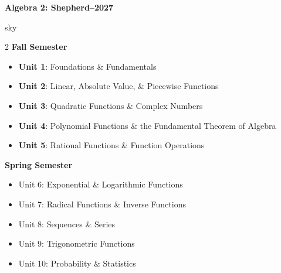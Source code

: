 \documentclass[12pt]{article}
\newcommand{\CourseName}{Algebra 2: Shepherd}
\newcommand{\SchoolYear}{2026--2027}
\begin{document}
    \begin{center}
        {\Large\bfseries \CourseName \quad \SchoolYear}
    \end{center}

    \renewcommand{\arraystretch}{1.6}
    \begin{skillbox}{sky}
        \setlength{\parskip}{0.6em}
        \setlength{\parindent}{0pt}
        \setlength{\columnsep}{1cm}
        \begin{multicols}{2}
            \raggedcolumns
            \textbf{Fall Semester}
            \begin{itemize}
                \item \textbf{Unit 1}:  Foundations \& Fundamentals
                \item \textbf{Unit 2}:  Linear, Absolute Value, \& Piecewise Functions
                \item \textbf{Unit 3}:  Quadratic Functions \& Complex Numbers
                \item \textbf{Unit 4}:  Polynomial Functions \& the Fundamental Theorem of Algebra
                \item \textbf{Unit 5}:  Rational Functions \& Function Operations
            \end{itemize}
            \columnbreak
            \textbf{Spring Semester}
            \begin{itemize}
                \item Unit 6:  Exponential \& Logarithmic Functions
                \item Unit 7:  Radical Functions \& Inverse Functions
                \item Unit 8:  Sequences \& Series
                \item Unit 9:  Trigonometric Functions
                \item Unit 10:  Probability \& Statistics
            \end{itemize}
        \end{multicols}
    \end{skillbox}
\end{document}
